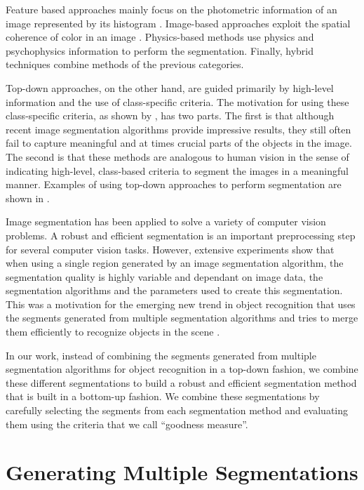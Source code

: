 \documentclass{llncs}
\begin{document}
Feature based approaches mainly focus on the photometric information of an image represented by its histogram
\cite{1059188}. Image-based approaches exploit the spatial coherence of color in
an image \cite{649319}. Physics-based methods use physics and psychophysics information to perform the
segmentation. Finally, hybrid techniques combine methods of the previous categories.

Top-down approaches, on the other hand, are guided primarily by high-level information and the use of
class-specific criteria. The motivation for using these class-specific criteria, as shown by \cite{649285},
has two parts. The first is that although recent image segmentation algorithms provide impressive
results, they still often fail to capture meaningful and at times crucial parts of the objects in the image.
The second is that these methods are analogous to human vision in the sense of indicating high-level,
class-based criteria to segment the images in a meaningful manner. Examples of using top-down approaches to
perform segmentation are shown in \cite{649285,Leibe04combinedobject}.

Image segmentation has been applied to solve a variety of computer vision problems.
A robust and efficient segmentation is an important preprocessing step for several computer vision tasks.
However, extensive experiments \cite{Unnikrishnan_2007_5789}
show that when using a single region generated by an image segmentation algorithm, the segmentation quality is
highly variable and dependant on image data, the segmentation algorithms and the parameters used to create this
segmentation. This was a motivation for the emerging new trend in object recognition that uses the segments
generated from multiple segmentation algorithms and tries to merge them efficiently to recognize objects in the
scene \cite{Efros_2006_5395,PSH08}.

In our work, instead of combining the segments generated from multiple segmentation algorithms for object
recognition in a top-down fashion, we combine these different segmentations to build a
robust and efficient segmentation method that is built in a bottom-up fashion. We combine these segmentations
by carefully selecting the segments from each segmentation method and evaluating them using the criteria that
we call ``goodness measure''.

\section{Generating Multiple Segmentations}\label{sec:multiseg}
\end{document}
